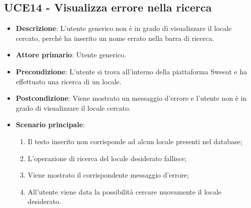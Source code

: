 \subsection{UCE14 - Visualizza errore nella ricerca}
\begin{itemize}
\item \textbf{Descrizione}: L'utente generico non è in grado di visualizzare il locale cercato, perché ha inserito un nome errato nella barra di ricerca.
\item \textbf{Attore primario}: Utente generico.
\item \textbf{Precondizione}: L'utente si trova all’interno della piattaforma Sweeat e ha effettuato una ricerca di un locale.
\item \textbf{Postcondizione}: Viene mostrato un messaggio d'errore e l'utente non è in grado di visualizzare il locale cercato.
\item \textbf{Scenario principale}:
\begin{enumerate}    
	\item Il testo inserito non corrisponde ad alcun locale presenti nel database;
	\item L'operazione di ricerca del locale desiderato fallisce;
	\item Viene mostrato il corrispondente messaggio d'errore;
	\item All'utente viene data la possibilità cercare nuovamente il locale desiderato.
\end{enumerate}
\end{itemize}